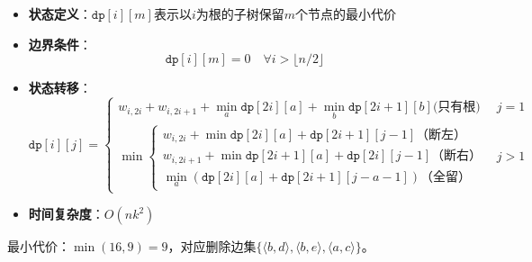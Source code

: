 \documentclass[./../main.tex]{subfiles}
\begin{document}
\begin{itemize}
    \item \textbf{状态定义}：$\texttt{dp}[i][m]$表示以$i$为根的子树保留$m$个节点的最小代价
    \item \textbf{边界条件}：
    $$
    \texttt{dp}[i][m] = 0 \quad \forall i > \lfloor n/2 \rfloor
    $$
    \item \textbf{状态转移}：
    $$
    \texttt{dp}[i][j] = \begin{cases}
    w_{i,2i}+w_{i,2i+1}+\min\limits_{a}\texttt{dp}[2i][a]+\min\limits_{b}\texttt{dp}[2i+1][b]\text{(只有根)} & j=1 \\
    \min\begin{cases}
    w_{i,2i}+\min\texttt{dp}[2i][a]+\texttt{dp}[2i+1][j-1] \text{（断左）}\\
    w_{i,2i+1}+\min\texttt{dp}[2i+1][a]+\texttt{dp}[2i][j-1]\text{（断右）} \\
    \min\limits_{a}(\texttt{dp}[2i][a]+\texttt{dp}[2i+1][j-a-1])\text{（全留）}
    \end{cases} & j>1
    \end{cases}
    $$
    \item \textbf{时间复杂度}：$O(nk^2)$
\end{itemize}

最小代价：$\min(16,9)=9$，对应删除边集$\{\langle b,d\rangle, \langle b,e\rangle, \langle a,c\rangle\}$。
\end{document}
